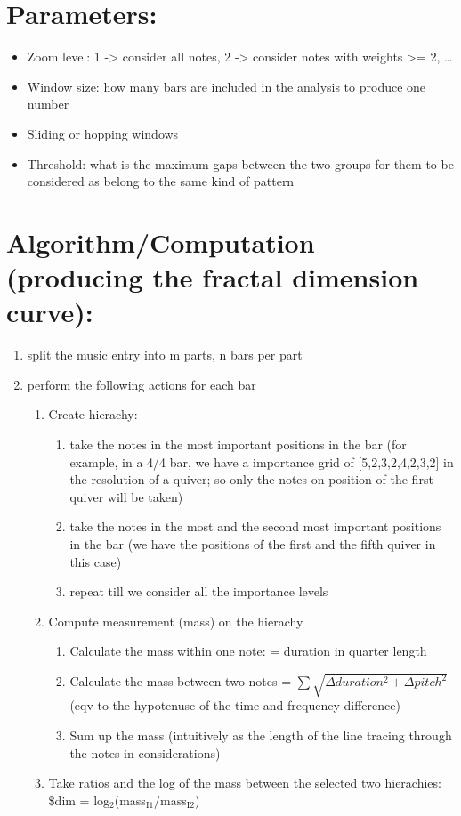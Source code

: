 \documentclass[11pt]{article}
\begin{document}
\section*{Parameters:}
\label{sec:org1c370dd}
\begin{itemize}
\item Zoom level: 1 -> consider all notes, 2 -> consider notes with weights >= 2, \ldots{}
\item Window size: how many bars are included in the analysis to produce one number
\item Sliding or hopping windows
\item Threshold: what is the maximum gaps between the two groups for them to be considered as belong to the same kind of pattern
\end{itemize}

\section*{Algorithm/Computation (producing the fractal dimension curve):}
\label{sec:orgd29220c}
\begin{enumerate}
\item split the music entry into m parts, n bars per part
\item perform the following actions for each bar
\begin{enumerate}
\item Create hierachy:
\begin{enumerate}
\item take the notes in the most important positions in the bar (for example, in a 4/4 bar, we have a importance grid of [5,2,3,2,4,2,3,2] in the resolution of a quiver; so only the notes on position of the first quiver will be taken)
\item take the notes in the most and the second most important positions in the bar (we have the positions of the first and the fifth quiver in this case)
\item repeat till we consider all the importance levels
\end{enumerate}
\item Compute measurement (mass) on the hierachy
\begin{enumerate}
\item Calculate the mass within one note: = duration in quarter length
\item Calculate the mass between two notes =  \(\sum \sqrt{\Delta duration^2 + \Delta pitch^2}\) (eqv to the hypotenuse of the time and frequency difference)
\item Sum up the mass (intuitively as the length of the line tracing through the notes in considerations)
\end{enumerate}
\item Take ratios and the log of the mass between the selected two hierachies: \$dim = log\(_{\text{2}}\)(mass\(_{\text{I1}}\)/mass\(_{\text{I2}}\))
\end{enumerate}
\end{enumerate}
\end{document}
